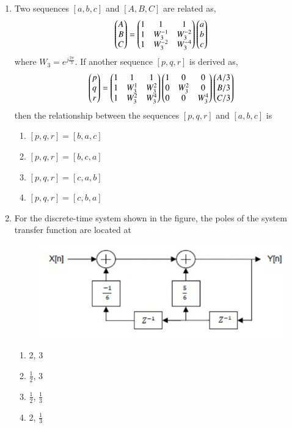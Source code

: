 \documentclass[a4paper, 11pt]{article}
\begin{document}
\begin{enumerate}
    \hfill{}

    \item Two sequences $[a,b,c]$ and $[A,B,C]$ are related as,
    \[ \begin{pmatrix}A\\ B\\ C\end{pmatrix} = \begin{pmatrix}1 & 1 & 1\\ 1 & W_{3}^{-1} & W_{3}^{-2}\\ 1 & W_{3}^{-2} & W_{3}^{-4}\end{pmatrix} \begin{pmatrix}a\\ b\\ c\end{pmatrix} \]
    where $W_{3}=e^{j\frac{2\pi}{3}}$. If another sequence $[p,q,r]$ is derived as,
    \[ \begin{pmatrix}p\\ q\\ r\end{pmatrix} = \begin{pmatrix}1 & 1 & 1\\ 1 & W_{3}^{1} & W_{3}^{2}\\ 1 & W_{3}^{2} & W_{3}^{4}\end{pmatrix} \begin{pmatrix}1 & 0 & 0\\ 0 & W_{3}^{2} & 0\\ 0 & 0 & W_{3}^{4}\end{pmatrix} \begin{pmatrix}A/3\\ B/3\\ C/3\end{pmatrix} \]
    then the relationship between the sequences $[p,q,r]$ and $[a,b,c]$ is
    \begin{enumerate}
        \item $[p,q,r]=[b,a,c]$
        \item $[p,q,r]=[b,c,a]$
        \item $[p,q,r]=[c,a,b]$
        \item $[p,q,r]=[c,b,a]$
    \end{enumerate}
    
    \hfill{}

    \item For the discrete-time system shown in the figure, the poles of the system transfer function are located at
    \begin{figure}[H]
        \centering
        \includegraphics[width=0.6\columnwidth]{figs/q54.png}
        \caption*{}
        \label{fig:q54}
    \end{figure}
    \begin{enumerate}
        \item 2, 3
        \item $\frac{1}{2}$, 3
        \item $\frac{1}{2}$, $\frac{1}{3}$
        \item 2, $\frac{1}{3}$
    \end{enumerate}
    

\end{enumerate}
\end{document}
